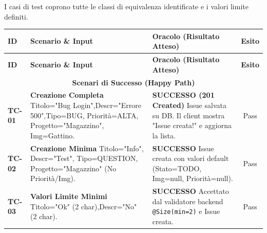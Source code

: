 \documentclass[a4paper,12pt]{article}
\begin{document}
I casi di test coprono tutte le classi di equivalenza identificate e i valori limite definiti.

\renewcommand{\arraystretch}{1.4}
\small
\begin{longtable}{|p{1.2cm}|p{6.0cm}|p{5.5cm}|c|}
    \hline
    \rowcolor{UninaBlue} 
    \textbf{\color{white}ID} & \textbf{\color{white}Scenario \& Input} & \textbf{\color{white}Oracolo (Risultato Atteso)} & \textbf{\color{white}Esito} \\ 
    \hline
    \endfirsthead
    
    \hline
    \rowcolor{UninaBlue} 
    \textbf{\color{white}ID} & \textbf{\color{white}Scenario \& Input} & \textbf{\color{white}Oracolo (Risultato Atteso)} & \textbf{\color{white}Esito} \\ 
    \hline
    \endhead

    \multicolumn{4}{|c|}{\cellcolor{BoxLight}\textbf{Scenari di Successo (Happy Path)}} \\ \hline
    
    \textbf{TC-01} & 
    \textbf{Creazione Completa} \newline
    Titolo="Bug Login",\newline Descr="Errore 500",\newline Tipo=BUG, \newline Priorità=ALTA, \newline Progetto="Magazzino", \newline Img=Gattino. & 
    \textbf{SUCCESSO (201 Created)} \newline
    Issue salvata su DB. Il client mostra "Issue creata!" e aggiorna la lista. & 
    Pass \\ \hline

    \textbf{TC-02} & 
    \textbf{Creazione Minima} \newline
    Titolo="Info", \newline Descr="Test", \newline Tipo=QUESTION, \newline Progetto="Magazzino" \newline (No Priorità/Img). & 
    \textbf{SUCCESSO} \newline
    Issue creata con valori default (Stato=TODO, Img=null,  Priorità=null). & 
    Pass \\ \hline

    \textbf{TC-03} & 
    \textbf{Valori Limite Minimi} \newline
    Titolo="Ok" (2 char),\newline Descr="No" (2 char). & 
    \textbf{SUCCESSO} \newline
    Accettato dal validatore backend \texttt{@Size(min=2)} e Issue creata. & 
    Pass \\ \hline


\end{longtable}
\end{document}
